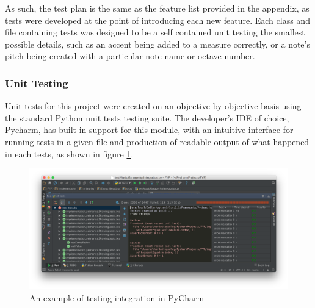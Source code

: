 As such, the test plan is the same as the feature list provided in the appendix, as tests were developed at the point of introducing each new feature. Each class and file containing tests was designed to be a self contained unit testing the smallest possible details, such as an accent being added to a measure correctly, or a note's pitch being created with a particular note name or octave number.

\subsubsection{Unit Testing}
Unit tests for this project were created on an objective by objective basis using the standard Python unit tests testing suite. The developer's IDE of choice, Pycharm, has built in support for this module, with an intuitive interface for running tests in a given file and production of readable output of what happened in each tests, as shown in figure \ref{fig:testing_interface}.

\begin{figure}[h]
	\centering
	\includegraphics[width=\textwidth]{testing_interface}	
	\caption{An example of testing integration in PyCharm}
	\label{fig:testing_interface}
\end{figure}


